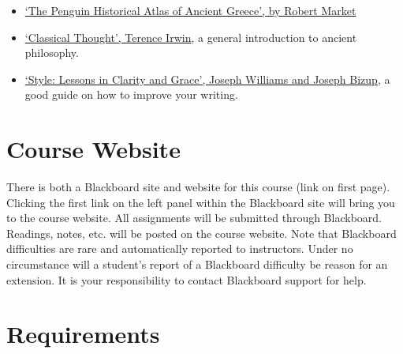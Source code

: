 \documentclass[article,oneside]{memoir}
\begin{document}
\begin{itemize}
\item \href{https://www.amazon.com/dp/0140513353/ref=cm_sw_em_r_mt_dp_U_kuAiEb647QCEW}{`The Penguin Historical Atlas of Ancient Greece', by Robert Market} 


\item \href{https://www.amazon.com/Classical-Thought-History-Western-Philosophy/dp/0192891774/ref=sr_1_1?s=books&ie=UTF8&qid=1515009994&sr=1-1&keywords=classical+thought}{`Classical Thought', Terence Irwin}, a general introduction to ancient philosophy.

\item \href{http://www.amazon.com/Style-Lessons-Clarity-Grace-11th/dp/0321898680/ref=sr_1_1?ie=UTF8&qid=1452356026&sr=8-1&keywords=lessons+in+clarity+and+grace}{`Style: Lessons in Clarity and Grace', Joseph Williams and Joseph Bizup}, a good guide on how to improve your writing. 
\end{itemize}
\section{Course Website}
There is both a Blackboard site and website for this course (link on first page). Clicking the first link on the left panel within the Blackboard site will bring you to the course website. All assignments will be submitted through Blackboard. Readings, notes, etc. will be posted on the course website. Note that Blackboard difficulties are rare and automatically reported to instructors. Under no circumstance will a student's report of a Blackboard difficulty be reason for an extension. It is your responsibility to contact Blackboard support for help.


\section{Requirements}
\end{document}
